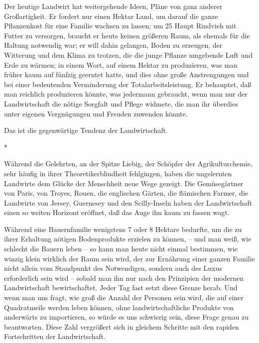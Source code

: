 \documentclass{scrbook}
\begin{document}
Der heutige Landwirt hat weitergehende Ideen, Pläne von ganz anderer Großartigkeit. Er fordert nur einen Hektar Land, um darauf die ganze Pflanzenkost für eine Familie wachsen zu lassen; um 25 Haupt Rindvieh mit Futter zu versorgen, braucht er heute keinen größeren Raum, als ehemals für die Haltung  notwendig war; er will dahin gelangen, Boden zu erzeugen, der Witterung und dem Klima zu trotzen, die die junge Pflanze umgebende Luft und Erde zu wärmen; in einem Wort, auf einem Hektar zu produzieren, was man früher kaum auf fünfzig geerntet hatte, und dies ohne große Anstrengungen und bei einer bedeutenden Verminderung der Totalarbeitsleistung. Er behauptet, daß man reichlich produzieren könnte, was jedermann gebraucht, wenn man nur der Landwirtschaft die nötige Sorgfalt und Pflege widmete, die man ihr überdies unter eigenen Vergnügungen und Freuden zuwenden könnte.

Das ist die gegenwärtige Tendenz der Landwirtschaft.

\begin{center}*\end{center}

Während die Gelehrten, an der Spitze Liebig, der Schöpfer der Agrikulturchemie, sehr häufig in ihrer Theoretikerblindheit fehlgingen, haben die ungelernten Landwirte dem Glücke der Menschheit neue Wege gezeigt. Die Gemüsegärtner von Paris, von Troyes, Rouen, die englischen Gärten, die flämischen Farmer, die Landwirte von Jersey, Guernesey und den Scilly-Inseln haben der Landwirtschaft einen so weiten Horizont eröffnet, daß das Auge ihn kaum zu fassen wagt.

Während eine Bauernfamilie wenigstens 7 oder 8 Hektare bedurfte, um die zu ihrer Erhaltung nötigen Bodenprodukte erzielen zu können, – und man weiß, wie schlecht die Bauern leben – so kann man heute nicht einmal bestimmen, wie winzig klein wirklich der Raum sein wird, der zur Ernährung einer ganzen Familie nicht allein vom Standpunkt des Notwendigen, sondern auch des Luxus erforderlich sein wird – sobald man ihn nur nach den Prinzipien der modernen Landwirtschaft bewirtschaftet. Jeder Tag fast setzt diese Grenze herab. Und wenn man uns fragt, wie groß die Anzahl der Personen sein wird, die auf einer Quadratmeile werden leben können, ohne landwirtschaftliche Produkte von anderwärts zu importieren, so würde es uns schwierig sein, diese Frage genau zu beantworten. Diese Zahl vergrößert sich in gleichem Schritte mit den rapiden Fortschritten der Landwirtschaft.
\end{document}
